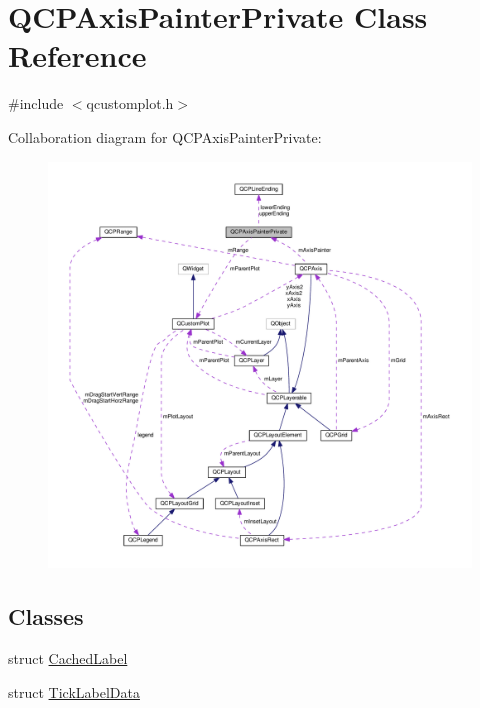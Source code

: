 \hypertarget{classQCPAxisPainterPrivate}{}\section{Q\+C\+P\+Axis\+Painter\+Private Class Reference}
\label{classQCPAxisPainterPrivate}


{\ttfamily \#include $<$qcustomplot.\+h$>$}



Collaboration diagram for Q\+C\+P\+Axis\+Painter\+Private\+:\nopagebreak
\begin{figure}[H]
\begin{center}
\leavevmode
\includegraphics[width=350pt]{classQCPAxisPainterPrivate__coll__graph}
\end{center}
\end{figure}
\subsection*{Classes}
\begin{DoxyCompactItemize}
\item 
struct \hyperlink{structQCPAxisPainterPrivate_1_1CachedLabel}{Cached\+Label}
\item 
struct \hyperlink{structQCPAxisPainterPrivate_1_1TickLabelData}{Tick\+Label\+Data}
\end{DoxyCompactItemize}
